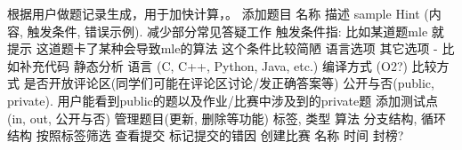 \markdownRendererUlItem 根据用户做题记录生成，用于加快计算，。\markdownRendererUlItemEnd 
\markdownRendererUlItem 添加题目\markdownRendererUlItemEnd 
\markdownRendererUlItem 名称\markdownRendererUlItemEnd 
\markdownRendererUlItem 描述\markdownRendererUlItemEnd 
\markdownRendererUlItem sample\markdownRendererUlItemEnd 
\markdownRendererUlItem Hint (内容, 触发条件, 错误示例). 减少部分常见答疑工作\markdownRendererInterblockSeparator
{}\markdownRendererUlBeginTight
\markdownRendererUlItem 触发条件指: 比如某道题mle 就提示 这道题卡了某种会导致mle的算法\markdownRendererUlItemEnd 
\markdownRendererUlItem 这个条件比较简陋\markdownRendererUlItemEnd 
\markdownRendererUlEndTight \markdownRendererUlItemEnd 
\markdownRendererUlItem 语言选项\markdownRendererInterblockSeparator
{}\markdownRendererUlBeginTight
\markdownRendererUlItem 其它选项 - 比如补充代码\markdownRendererUlItemEnd 
\markdownRendererUlItem 静态分析\markdownRendererUlItemEnd 
\markdownRendererUlItem 语言 (C, C++, Python, Java, etc.)\markdownRendererUlItemEnd 
\markdownRendererUlItem 编译方式 (O2?)\markdownRendererUlItemEnd 
\markdownRendererUlItem 比较方式\markdownRendererUlItemEnd 
\markdownRendererUlEndTight \markdownRendererUlItemEnd 
\markdownRendererUlItem 是否开放评论区(同学们可能在评论区讨论/发正确答案等)\markdownRendererUlItemEnd 
\markdownRendererUlItem 公开与否(public, private). 用户能看到public的题以及作业/比赛中涉及到的private题\markdownRendererUlItemEnd 
\markdownRendererUlItem 添加测试点 (in, out, 公开与否)\markdownRendererUlItemEnd 
\markdownRendererUlItem 管理题目(更新, 删除等功能)\markdownRendererUlItemEnd 
\markdownRendererUlItem 标签, 类型\markdownRendererUlItemEnd 
\markdownRendererUlItem 算法\markdownRendererUlItemEnd 
\markdownRendererUlItem 分支结构, 循环结构\markdownRendererUlItemEnd 
\markdownRendererUlItem 按照标签筛选\markdownRendererUlItemEnd 
\markdownRendererUlEnd \markdownRendererInterblockSeparator
{}\markdownRendererInterblockSeparator
{}\markdownRendererUlBeginTight
\markdownRendererUlItem 查看提交\markdownRendererUlItemEnd 
\markdownRendererUlItem 标记提交的错因\markdownRendererUlItemEnd 
\markdownRendererUlEndTight \markdownRendererInterblockSeparator
{}\markdownRendererInterblockSeparator
{}\markdownRendererUlBeginTight
\markdownRendererUlItem 创建比赛\markdownRendererUlItemEnd 
\markdownRendererUlItem 名称\markdownRendererUlItemEnd 
\markdownRendererUlItem 时间\markdownRendererUlItemEnd 
\markdownRendererUlItem 封榜?\markdownRendererUlItemEnd 

